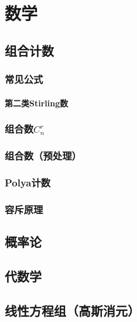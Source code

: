 
\chapter{数学}
\label{combinatorics}


\section{组合计数}

\subsection{常见公式}

\subsubsection{第二类Stirling数}

\subsection{组合数$C_{n}^{r}$}

\subsection{组合数（预处理）}

\subsection{Polya计数}

\subsection{容斥原理}



\section{概率论}

\section{代数学}

\section{线性方程组（高斯消元）}

